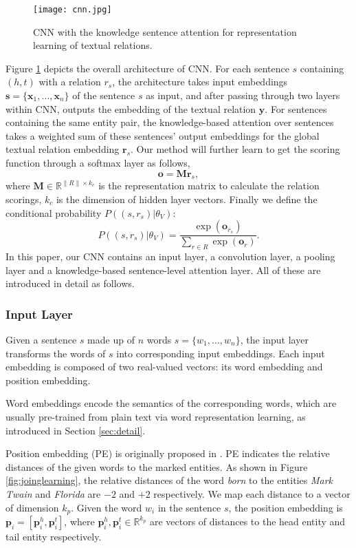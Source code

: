 \documentclass[11pt,a4paper]{article}
\begin{document}
\begin{figure}[]
\centering
\texttt{[image: cnn.jpg]}
\caption{CNN with the knowledge sentence attention for representation learning of textual relations.}
\label{fig:cnn}
\end{figure}



Figure \ref{fig:cnn} depicts the overall architecture of CNN. For each sentence $s$ containing $(h, t)$ with a relation $r_s$, the architecture takes input embeddings $\mathbf{s} = \{\mathbf{x}_1, \ldots, \mathbf{x}_n \}$ of the sentence $s$ as input, and after passing through two layers within CNN, outputs the embedding of the textual relation $\mathbf{y}$. For sentences containing the same entity pair, the knowledge-based attention over sentences takes a weighted sum of these sentences' output embeddings for the global textual relation embedding $\mathbf{r}_s$. Our method will further learn to get the scoring function through a softmax layer as follows,
\begin{equation}
\mathbf{o} = \mathbf{M}\mathbf{r}_s,
\label{eq:cnn_distance}
\end{equation}
where $\mathbf{M} \in \mathbb{R}^{\|R\| \times k_c} $ is the representation matrix to calculate the relation scorings, $k_c$ is the dimension of hidden layer vectors. Finally we define the conditional probability $P((s, r_s)|{\theta_V})$:
\begin{equation}
P((s, r_s)|{\theta_V}) = \frac{\exp(\mathbf{o}_{r_s})}{\sum_{r \in R} \exp(\mathbf{o}_{r})}.
\label{eq:cnn_distance1}
\end{equation}
In this paper, our CNN contains an input layer, a convolution layer, a pooling layer and a knowledge-based sentence-level attention layer. All of these are introduced in detail as follows.

\subsubsection{Input Layer}
Given a sentence $s$ made up of $n$ words $s = \{ w_1, \ldots , w_n\}$, the input layer transforms the words of $s$ into corresponding input embeddings. Each input embedding is composed of two real-valued vectors: its word embedding and position embedding.

Word embeddings encode the semantics of the corresponding words, which are usually pre-trained from plain text via word representation learning, as introduced in Section \ref{sec:detail}.

Position embedding (PE) is originally proposed in \cite{zeng2014relation}. PE indicates the relative distances of the given words to the marked entities. As shown in Figure \ref{fig:joinglearning}, the relative distances of the word \emph{born} to the entities \emph{Mark Twain} and \emph{Florida} are $-2$ and $+2$ respectively. We map each distance to a vector of dimension $k_p$. Given the word $w_i$ in the sentence $s$, the position embedding is $\mathbf{p}_i = [\mathbf{p}^h_i, \mathbf{p}^t_i]$, where $\mathbf{p}^h_i, \mathbf{p}^t_i \in \mathbb{R}^{k_p}$ are vectors of distances to the head entity and tail entity respectively.
\end{document}
